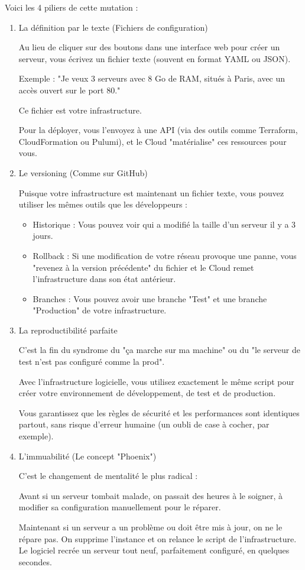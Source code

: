\documentclass{rapportClass} %
\begin{document}
Voici les 4 piliers de cette mutation :
\begin{enumerate}
\item La définition par le texte (Fichiers de configuration)

  Au lieu de cliquer sur des boutons dans une interface web pour créer
  un serveur, vous écrivez un fichier texte (souvent en format YAML ou
  JSON).

  Exemple : "Je veux 3 serveurs avec 8 Go de RAM, situés à Paris, avec
  un accès ouvert sur le port 80."

  Ce fichier est votre infrastructure.

  Pour la déployer, vous l'envoyez à une API (via des outils comme
  Terraform, CloudFormation ou Pulumi), et le Cloud "matérialise" ces
  ressources pour vous.

  \item Le versioning (Comme sur GitHub)

    Puisque votre infrastructure est maintenant un fichier texte, vous
    pouvez utiliser les mêmes outils que les développeurs :
    \begin{itemize}
    \item Historique : Vous pouvez voir qui a modifié la taille d'un serveur il y a 3 jours.
    \item Rollback : Si une modification de votre réseau provoque une
      panne, vous "revenez à la version précédente" du fichier et le
      Cloud remet l'infrastructure dans son état antérieur.
    \item Branches : Vous pouvez avoir une branche "Test" et une branche "Production" de votre infrastructure.
    \end{itemize}

  \item La reproductibilité parfaite

    C'est la fin du syndrome du "ça marche sur ma machine" ou du "le
    serveur de test n'est pas configuré comme la prod".

    Avec l'infrastructure logicielle, vous utilisez exactement le même
    script pour créer votre environnement de développement, de test et
    de production.

    Vous garantissez que les règles de sécurité et les performances
    sont identiques partout, sans risque d'erreur humaine (un oubli de
    case à cocher, par exemple).

  \item  L'immuabilité (Le concept "Phoenix")

    C'est le changement de mentalité le plus radical :

    Avant si un serveur tombait
    malade, on passait des heures à le soigner, à modifier sa
    configuration manuellement pour le réparer.

    Maintenant si un serveur a un problème ou
    doit être mis à jour, on ne le répare pas. On supprime l'instance
    et on relance le script de l'infrastructure. Le logiciel recrée un
    serveur tout neuf, parfaitement configuré, en quelques secondes.
  \end{enumerate}
\end{document}
